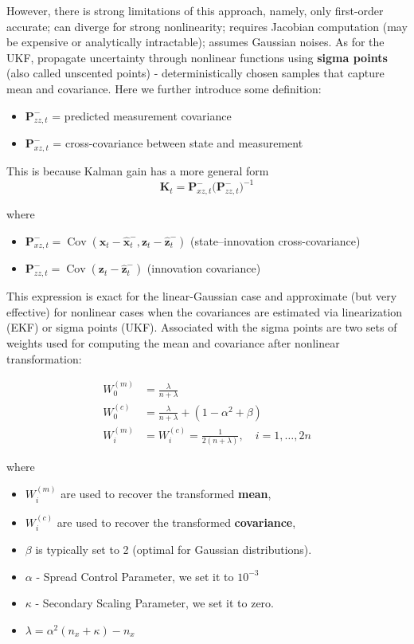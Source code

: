 \documentclass{article}
\renewcommand{\v}[1]{ \ensuremath{ {\mathbf{#1}} }}
\DeclareMathOperator{\Cov}{Cov}   %
\begin{document}
However, there is strong limitations of this approach, namely, only first-order accurate; can diverge for strong nonlinearity; requires Jacobian computation (may be expensive or analytically intractable); assumes Gaussian noises. As for the UKF, propagate uncertainty through nonlinear functions using \textbf{sigma points} (also called unscented points) - deterministically chosen samples that capture mean and covariance. Here we further introduce some definition:
\begin{itemize}
\item $\v P_{zz,t}^{-}$ = predicted measurement covariance
\item $\v P_{xz,t}^{-}$ = cross-covariance between state and measurement
\end{itemize}
This is because Kalman gain has a more general form \begin{equation}
\v K_t = \v P_{xz,t}^{-} \bigl( \v P_{zz,t}^{-} \bigr)^{-1}
\label{eq:general-kalman-gain}
\end{equation}

where
\begin{itemize}
\item $\v P_{xz,t}^{-} = \Cov(\v x_t - \hat{\v x}_t^{-}, \v z_t - \hat{\v z}_t^{-})$ \quad (state–innovation cross-covariance)
\item $\v P_{zz,t}^{-} = \Cov(\v z_t - \hat{\v z}_t^{-})$ \quad (innovation covariance)
\end{itemize}

This expression is exact for the linear-Gaussian case and approximate (but very effective) for nonlinear cases when the covariances are estimated via linearization (EKF) or sigma points (UKF). Associated with the sigma points are two sets of weights used for computing the mean and covariance after nonlinear transformation:

\begin{align}
W_0^{(m)} &= \frac{\lambda}{n + \lambda} \\
W_0^{(c)} &= \frac{\lambda}{n + \lambda} + (1 - \alpha^2 + \beta) \\
W_i^{(m)} &= W_i^{(c)} = \frac{1}{2(n + \lambda)}, \quad i = 1, \dots, 2n
\end{align}

where
\begin{itemize}
\item $W^{(m)}_i$ are used to recover the transformed \textbf{mean},
\item $W^{(c)}_i$ are used to recover the transformed \textbf{covariance},
\item $\beta$ is typically set to 2 (optimal for Gaussian distributions).
\item $\alpha$ - Spread Control Parameter, we set it to $10^{-3}$
\item $\kappa$  - Secondary Scaling Parameter, we set it to zero.
\item $\lambda = \alpha^2(n_x + \kappa) - n_x$
\end{itemize}
\end{document}
